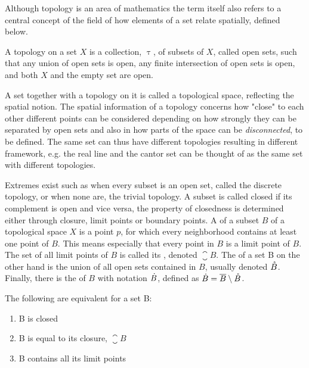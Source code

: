 \documentclass[../../main.tex]{subfiles}
\begin{document}
    Although topology is an area of mathematics the term itself also refers to a central concept of the field of how elements of a set relate spatially, defined below. 

    \begin{definition}
        A topology on a set $X$ is a collection, $\uptau$, of subsets of $X$, called open sets, such that any union of open sets is open, any finite intersection of open sets is open, and both $X$ and the empty set are open. 
    \end{definition}

    A set together with a topology on it is called a topological space, reflecting the spatial notion. The spatial information of a topology concerns how "close" to each other different points can be considered depending on how strongly they can be separated by open sets and also in how parts of the space can be \textit{disconnected}, to be defined. The same set can thus have different topologies resulting in different framework, e.g. the real line and the cantor set can be thought of as the same set with different topologies. 
            
    Extremes exist such as when every subset is an open set, called the discrete topology, or when none are, the trivial topology. A subset is called closed if its complement is open and vice versa, the property of closedness is determined either through closure, limit points or boundary points. A  of a subset $B$ of a topological space $X$ is a point $p$, for which every neighborhood contains at least one point of $B$. This means especially that every point in $B$ is a limit point of $B$. The set of all limit points of $B$ is called its , denoted $\closure{B}$. The  of a set B on the other hand is the union of all open sets contained in $B$, usually denoted $\mathring{B}$. Finally, there is the  of $B$ with notation $\dot{B}$, defined as $\dot{B} = \overline{B} \setminus \mathring{B}$.
    
    \begin{proposition}
        The following are equivalent for a set B:
        \begin{enumerate}
            \item B is closed
            \item B is equal to its closure, $\closure{B}$
            \item B contains all its limit points
        \end{enumerate}
    \end{proposition}
\end{document}
